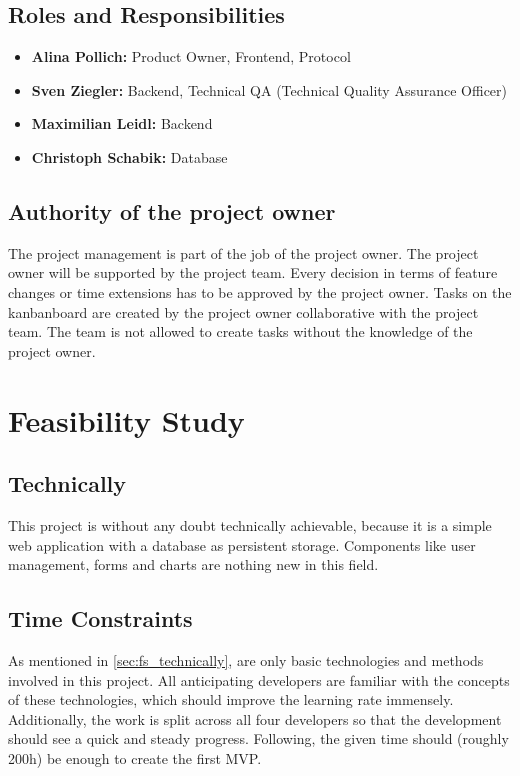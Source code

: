 \documentclass[a4paper,12pt]{article}
\begin{document}
\subsection{Roles and Responsibilities}
\begin{itemize}
	\item \textbf{Alina Pollich:} Product Owner, Frontend, Protocol
	\item \textbf{Sven Ziegler:} Backend, Technical QA (Technical Quality Assurance Officer)
	\item \textbf{Maximilian Leidl:} Backend
	\item \textbf{Christoph Schabik:} Database
\end{itemize}

\subsection{Authority of the project owner}
The project management is part of the job of the project owner. The project owner will be supported by the project team.
Every decision in terms of feature changes or time extensions  has to be approved by the project owner.
Tasks on the kanbanboard are created by the project owner collaborative with the project team.
The team is not allowed to create tasks without the knowledge of the project owner.

\section{Feasibility Study}
\subsection{Technically}
\label{sec:fs_technically}
This project is without any doubt technically achievable, because it is a simple web application with a database as persistent storage.
Components like user management, forms and charts are nothing new in this field.

\subsection{Time Constraints}
As mentioned in \autoref{sec:fs_technically}, are only basic technologies and methods involved in this project.
All anticipating developers are familiar with the concepts of these technologies, which should improve the learning rate immensely.
Additionally, the work is split across all four developers so that the development should see a quick and steady progress.
Following, the given time should (roughly 200h) be enough to create the first MVP.
\end{document}
